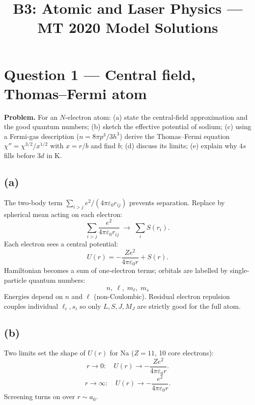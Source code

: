 \documentclass[11pt]{article}
\title{B3: Atomic and Laser Physics --- MT 2020 Model Solutions}
\author{}
\date{}
\begin{document}
\maketitle

\section*{Question 1 --- Central field, Thomas--Fermi atom}

\textbf{Problem.} For an $N$-electron atom: (a) state the central-field approximation and the good quantum numbers; (b) sketch the effective potential of sodium; (c) using a Fermi-gas description ($n=8\pi p^3/3h^3$) derive the Thomas--Fermi equation $\chi''=\chi^{3/2}/x^{1/2}$ with $x=r/b$ and find $b$; (d) discuss its limits; (e) explain why $4s$ fills before $3d$ in K.

\subsection*{(a)}

The two-body term $\sum_{i>j}e^2/(4\pi\varepsilon_0 r_{ij})$ prevents separation. Replace by spherical mean acting on each electron:
\[
\sum_{i>j}\frac{e^2}{4\pi\varepsilon_0 r_{ij}}\;\longrightarrow\;\sum_i S(r_i).
\]
Each electron sees a central potential:
\[
U(r)=-\frac{Ze^2}{4\pi\varepsilon_0 r}+S(r).
\]
Hamiltonian becomes a sum of one-electron terms; orbitals are labelled by single-particle quantum numbers:
\[
\boxed{\;n,\;\ell,\;m_\ell,\;m_s\;}
\]
Energies depend on $n$ and $\ell$ (non-Coulombic). Residual electron repulsion couples individual $\ell_i,s_i$ so only $L,S,J,M_J$ are strictly good for the full atom.

\subsection*{(b)}

Two limits set the shape of $U(r)$ for Na ($Z=11$, 10 core electrons):
\[
r\to 0:\quad U(r)\to -\frac{Ze^2}{4\pi\varepsilon_0 r}.
\]
\[
r\to\infty:\quad U(r)\to -\frac{e^2}{4\pi\varepsilon_0 r}.
\]
Screening turns on over $r\sim a_0$.
\end{document}
